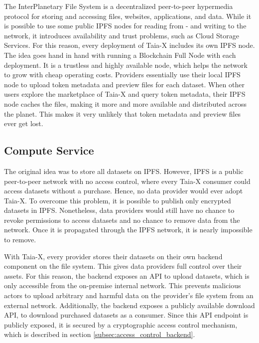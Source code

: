 The InterPlanetary File System is a decentralized peer-to-peer hypermedia protocol for storing and accessing files, websites, applications, and data. While it is possible to use some public IPFS nodes for reading from - and writing to the network, it introduces availability and trust problems, such as Cloud Storage Services. For this reason, every deployment of Taia-X includes its own IPFS node. The idea goes hand in hand with running a Blockchain Full Node with each deployment. It is a trustless and highly available node, which helps the network to grow with cheap operating costs. Providers essentially use their local IPFS node to upload token metadata and preview files for each dataset. When other users explore the marketplace of Taia-X and query token metadata, their IPFS node caches the files, making it more and more available and distributed across the planet. This makes it very unlikely that token metadata and preview files ever get lost.
            
\subsection{Compute Service}
\label{subsec:compute}
        
The original idea was to store all datasets on IPFS. However, IPFS is a public peer-to-peer network with no access control, where every Taia-X consumer could access datasets without a purchase. Hence, no data provider would ever adopt Taia-X. To overcome this problem, it is possible to publish only encrypted datasets in IPFS. Nonetheless, data providers would still have no chance to revoke permissions to access datasets and no chance to remove data from the network. Once it is propagated through the IPFS network, it is nearly impossible to remove.
            
With Taia-X, every provider stores their datasets on their own backend component on the file system. This gives data providers full control over their assets. For this reason, the backend exposes an API to upload datasets, which is only accessible from the on-premise internal network. This prevents malicious actors to upload arbitrary and harmful data on the provider's file system from an external network. Additionally, the backend exposes a publicly available download API, to download purchased datasets as a consumer. Since this API endpoint is publicly exposed, it is secured by a cryptographic access control mechanism, which is described in section \ref{subsec:access_control_backend}.

